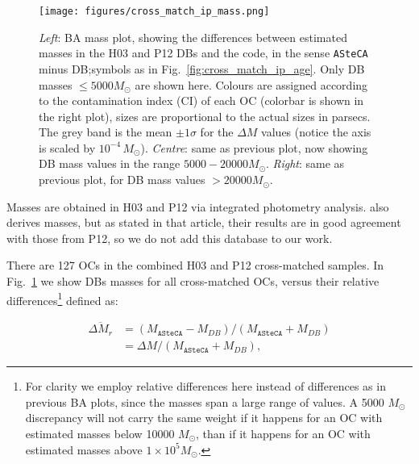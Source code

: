 \documentclass[a4paper,fleqn,usenatbib]{mnras}
\begin{document}
\begin{figure*}
\texttt{[image: figures/cross\_match\_ip\_mass.png]}
\caption{\emph{Left}: BA mass plot, showing the differences between estimated
masses in the H03 and P12 DBs and the code, in the sense \texttt{ASteCA} minus
DB;\@ symbols as in Fig.~\ref{fig:cross_match_ip_age}.
Only DB masses $\le5000M_{\odot}$ are shown here.
Colours are assigned according to the contamination index (CI) of each OC 
(colorbar is shown in the right plot), sizes are proportional to the actual
sizes in parsecs. The grey band is the mean $\pm 1\sigma$ for the $\Delta M$
values (notice the axis is scaled by $10^{-4}\,M_{\odot}$).
\emph{Centre}: same as previous plot, now showing DB mass values in the range
$5000-20000M_{\odot}$.
\emph{Right}: same as previous plot, for DB mass values $>20000M_{\odot}$.}
\label{fig:cross_match_ip_mass}
\end{figure*}

%
%
%
%
Masses are obtained in H03 and P12 via integrated photometry analysis.
\cite{Baumgardt_2013} also derives masses, but as stated in that article, their
results are in good agreement with those from P12, so we do not add this
database to our work.

There are 127 OCs in the combined H03 and P12 cross-matched samples.
In Fig.~\ref{fig:cross_match_ip_mass} we show DBs masses for all cross-matched
OCs, versus their relative differences\footnote{For clarity we employ relative
differences here instead of
differences as in previous BA plots, since the masses span a large range of
values. A 5000 $M_{\odot}$ discrepancy will not carry the same weight if it
happens for an OC with estimated masses below 10000 $M_{\odot}$, than if it
happens for an OC with estimated masses above $1{\times}10^5M_{\odot}$.}
defined as:

\begin{equation}
\begin{split}
\overline{\Delta M_r} & = (M_{\mathtt{ASteCA}}-M_{DB})/(M_{\mathtt{ASteCA}}
+M_{DB}) \\
& = \Delta M/(M_{\mathtt{ASteCA}}+M_{DB}),
\end{split}
\label{eq:rel_diffs}
\end{equation}
\end{document}

